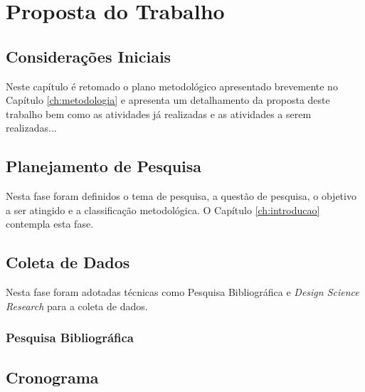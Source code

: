     \chapter{Proposta do Trabalho}
\label{ch:proposta}

\section{Considerações Iniciais}

Neste capítulo é retomado o plano metodológico apresentado brevemente no Capítulo \ref{ch:metodologia} e apresenta um detalhamento da proposta deste trabalho bem como as atividades já realizadas e as atividades a serem realizadas... 

\section{Planejamento de Pesquisa}

Nesta fase foram definidos o tema de pesquisa, a questão de pesquisa, o objetivo a ser atingido e a classificação metodológica. O Capítulo \ref{ch:introducao} contempla esta fase.

\section{Coleta de Dados}

Nesta fase foram adotadas técnicas como Pesquisa Bibliográfica e \textit{Design Science Research} para a coleta de dados. 

\subsection{Pesquisa Bibliográfica}

\section{Cronograma}
